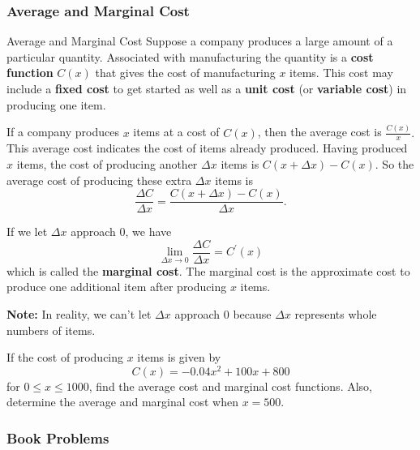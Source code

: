 \documentclass[cal1spr16Lectures.tex]{subfiles}
\begin{document}
\subsubsection{Average and Marginal Cost}

\begin{frame}{\small Average and Marginal Cost}
Suppose a company produces a large amount of a particular quantity.  Associated with manufacturing the quantity is a {\bf cost function} $C(x)$ that gives the cost of manufacturing $x$ items.  This cost may include a {\bf fixed cost} to get started as well as a {\bf unit cost} (or {\bf variable cost}) in producing one item.
\end{frame}

\begin{frame}{}
If a company produces $x$ items at a cost of $C(x)$, then the average cost is $\frac{C(x)}{x}.$  This average cost indicates the cost of items already produced.  Having produced $x$ items, the cost of producing another $\Delta x$ items is $C(x+\Delta x)-C(x)$.  So the average cost of producing these extra $\Delta x$ items is 
\[\frac{\Delta C}{\Delta x}=\frac{C(x+\Delta x)-C(x)}{\Delta x}.\]
\end{frame}

\begin{frame}{}
If we let $\Delta x$ approach 0, we have
\[\lim_{\Delta x \to 0}\frac{\Delta C}{\Delta x}=C^{\prime}(x)\]
which is called the {\bf marginal cost}.  The marginal cost is the approximate cost to produce one additional item after producing $x$ items.

\vspace{1pc}
{\bf Note:}  In reality, we can't let $\Delta x$ approach 0 because $\Delta x$ represents whole numbers of items.
\end{frame}

\begin{frame}
\begin{exe} If the cost of producing $x$ items is given by 
\[C(x)=-0.04x^2+100x+800\]
for $0 \le x \le 1000$, find the average cost and marginal cost functions.  Also, determine the average and marginal cost when $x=500.$ \end{exe}
\end{frame}

\subsubsection{Book Problems}
\end{document}
